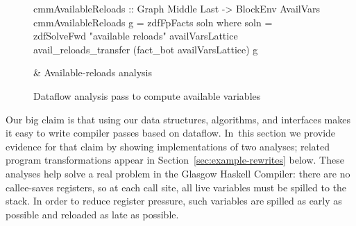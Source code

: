 \documentclass[blockstyle,preprint,nocopyrightspace]{sigplanconf}
\newcommand\secref[1]{Section~\ref{sec:#1}}
\newcommand\figlabel[1]{\label{fig:#1}}
\begin{document}
\begin{figure*}
\begin{codetable}
\T\begin{code}
cmmAvailableReloads :: Graph Middle Last -> BlockEnv AvailVars
cmmAvailableReloads g = zdfFpFacts soln
  where soln = zdfSolveFwd "available reloads" availVarsLattice 
               avail_reloads_transfer (fact_bot availVarsLattice) g
\end{code}\B
& Available-reloads analysis\\

\end{codetable}
\caption{Dataflow analysis pass to compute available variables}
\figlabel{avail-all}
\figlabel{avail}
\figlabel{avail-lattice}
\figlabel{avail-gen-kill}
\figlabel{avail-transfers}
\figlabel{avail-running}
\end{figure*}

% 
% 
% 
% 


Our big claim is that using our data structures, algorithms, and
interfaces makes it easy to write compiler passes based on dataflow.
In~this section we provide evidence for that claim by showing
implementations of two analyses;
related program transformations appear in \secref{example-rewrites}
below. 
These analyses help solve a real problem in the Glasgow Haskell
Compiler:
there are no callee-saves registers, so at each call site, all live
variables must be spilled to the stack.
In order to reduce register pressure,
such variables are spilled as early as possible and reloaded as late as possible.
\end{document}
